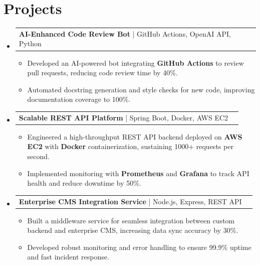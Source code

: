 \documentclass[letterpaper,11pt]{article}
\makeatletter
\newcommand{\resumeItem}[1]{
  \item\footnotesize{
    {#1 \vspace{-2pt}}
  }
}
\newcommand{\resumeProjectHeading}[2]{
    \item
    \begin{tabular*}{1.001\textwidth}{l@{\extracolsep{\fill}}r}
      \small#1 & \textbf{\small #2}\\
    \end{tabular*}\vspace{-7pt}
}
\newcommand{\resumeSubHeadingListStart}{\begin{itemize}[leftmargin=0pt, label={}]}
\newcommand{\resumeSubHeadingListEnd}{\end{itemize}}
\newcommand{\resumeItemListStart}{\begin{itemize}[leftmargin=*]}
\newcommand{\resumeItemListEnd}{\end{itemize}\vspace{-5pt}}
\makeatother
\begin{document}
\section{Projects}
    \vspace{-5pt}
    \resumeSubHeadingListStart
      \resumeProjectHeading
          {\textbf{AI-Enhanced Code Review Bot} | GitHub Actions, OpenAI API, Python}{}
          \resumeItemListStart
              \resumeItem{Developed an AI-powered bot integrating \textbf{GitHub Actions} to review pull requests, reducing code review time by 40\%.}
              \resumeItem{Automated docstring generation and style checks for new code, improving documentation coverage to 100\%.}
          \resumeItemListEnd
          \vspace{-12pt}
      \resumeProjectHeading
          {\textbf{Scalable REST API Platform} | Spring Boot, Docker, AWS EC2}{}
          \resumeItemListStart
              \resumeItem{Engineered a high-throughput REST API backend deployed on \textbf{AWS EC2} with \textbf{Docker} containerization, sustaining 1000+ requests per second.}
              \resumeItem{Implemented monitoring with \textbf{Prometheus} and \textbf{Grafana} to track API health and reduce downtime by 50\%.}
          \resumeItemListEnd
          \vspace{-12pt}
      \resumeProjectHeading
          {\textbf{Enterprise CMS Integration Service} | Node.js, Express, REST API}{}
          \resumeItemListStart
              \resumeItem{Built a middleware service for seamless integration between custom backend and enterprise CMS, increasing data sync accuracy by 30\%.}
              \resumeItem{Developed robust monitoring and error handling to ensure 99.9\% uptime and fast incident response.}
          \resumeItemListEnd
    \resumeSubHeadingListEnd
\end{document}
